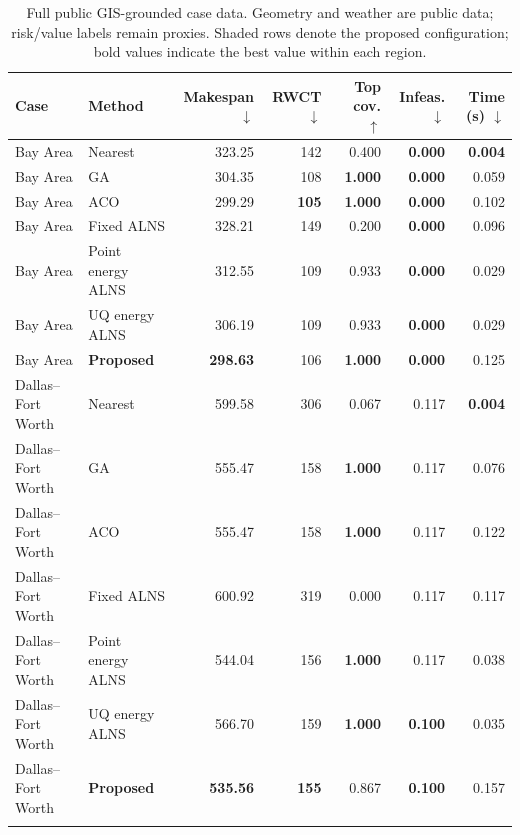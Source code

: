 ﻿\begin{table}[H]
\centering
\caption{Full public GIS-grounded case data. Geometry and weather are public data; risk/value labels remain proxies. Shaded rows denote the proposed configuration; bold values indicate the best value within each region.}
\label{tab:gis-results}
\small
\setlength{\tabcolsep}{2.7pt}
\begin{tabular}{@{}llrrrrr@{}}
\toprule
Case & Method & Makespan $\downarrow$ & RWCT $\downarrow$ & Top cov. $\uparrow$ & Infeas. $\downarrow$ & Time (s) $\downarrow$ \\
\midrule

Bay Area & Nearest & 323.25 & 142 & 0.400 & \textbf{0.000} & \textbf{0.004} \\

Bay Area & GA & 304.35 & 108 & \textbf{1.000} & \textbf{0.000} & 0.059 \\

Bay Area & ACO & 299.29 & \textbf{105} & \textbf{1.000} & \textbf{0.000} & 0.102 \\

Bay Area & Fixed ALNS & 328.21 & 149 & 0.200 & \textbf{0.000} & 0.096 \\

Bay Area & Point energy ALNS & 312.55 & 109 & 0.933 & \textbf{0.000} & 0.029 \\

Bay Area & UQ energy ALNS & 306.19 & 109 & 0.933 & \textbf{0.000} & 0.029 \\
\rowcolor{gray!10}
Bay Area & \textbf{Proposed} & \textbf{298.63} & 106 & \textbf{1.000} & \textbf{0.000} & 0.125 \\
\addlinespace[2pt]

Dallas--Fort Worth & Nearest & 599.58 & 306 & 0.067 & 0.117 & \textbf{0.004} \\

Dallas--Fort Worth & GA & 555.47 & 158 & \textbf{1.000} & 0.117 & 0.076 \\

Dallas--Fort Worth & ACO & 555.47 & 158 & \textbf{1.000} & 0.117 & 0.122 \\

Dallas--Fort Worth & Fixed ALNS & 600.92 & 319 & 0.000 & 0.117 & 0.117 \\

Dallas--Fort Worth & Point energy ALNS & 544.04 & 156 & \textbf{1.000} & 0.117 & 0.038 \\

Dallas--Fort Worth & UQ energy ALNS & 566.70 & 159 & \textbf{1.000} & \textbf{0.100} & 0.035 \\
\rowcolor{gray!10}
Dallas--Fort Worth & \textbf{Proposed} & \textbf{535.56} & \textbf{155} & 0.867 & \textbf{0.100} & 0.157 \\
\addlinespace[2pt]


\end{tabular}
\end{table}
